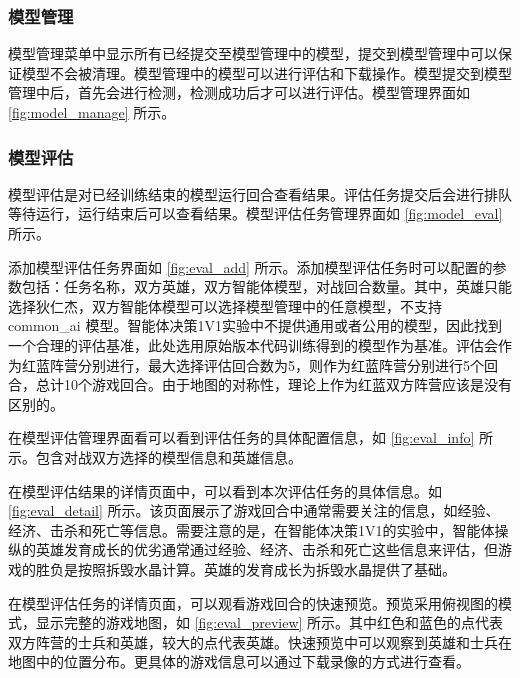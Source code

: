 \subsubsection{模型管理}

模型管理菜单中显示所有已经提交至模型管理中的模型，提交到模型管理中可以保证模型不会被清理。模型管理中的模型可以进行评估和下载操作。模型提交到模型管理中后，首先会进行检测，检测成功后才可以进行评估。模型管理界面如 \cref{fig:model_manage} 所示。

\subsubsection{模型评估}


模型评估是对已经训练结束的模型运行回合查看结果。评估任务提交后会进行排队等待运行，运行结束后可以查看结果。模型评估任务管理界面如 \cref{fig:model_eval} 所示。


添加模型评估任务界面如 \cref{fig:eval_add} 所示。添加模型评估任务时可以配置的参数包括：任务名称，双方英雄，双方智能体模型，对战回合数量。其中，英雄只能选择狄仁杰，双方智能体模型可以选择模型管理中的任意模型，不支持 common\_ai 模型。智能体决策1V1实验中不提供通用或者公用的模型，因此找到一个合理的评估基准，此处选用原始版本代码训练得到的模型作为基准。评估会作为红蓝阵营分别进行，最大选择评估回合数为5，则作为红蓝阵营分别进行5个回合，总计10个游戏回合。由于地图的对称性，理论上作为红蓝双方阵营应该是没有区别的。

在模型评估管理界面看可以看到评估任务的具体配置信息，如 \cref{fig:eval_info} 所示。包含对战双方选择的模型信息和英雄信息。

在模型评估结果的详情页面中，可以看到本次评估任务的具体信息。如 \cref{fig:eval_detail} 所示。该页面展示了游戏回合中通常需要关注的信息，如经验、经济、击杀和死亡等信息。需要注意的是，在智能体决策1V1的实验中，智能体操纵的英雄发育成长的优劣通常通过经验、经济、击杀和死亡这些信息来评估，但游戏的胜负是按照拆毁水晶计算。英雄的发育成长为拆毁水晶提供了基础。

在模型评估任务的详情页面，可以观看游戏回合的快速预览。预览采用俯视图的模式，显示完整的游戏地图，如 \cref{fig:eval_preview} 所示。其中红色和蓝色的点代表双方阵营的士兵和英雄，较大的点代表英雄。快速预览中可以观察到英雄和士兵在地图中的位置分布。更具体的游戏信息可以通过下载录像的方式进行查看。

